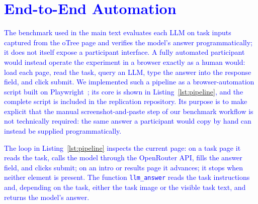 \documentclass[12pt,a4paper]{article}
\newcommand{\blue}[1]{\textcolor{blue}{#1}}
\begin{document}

\section{\blue{End-to-End Automation}}\label{app:pipeline}

\blue{The benchmark used in the main text evaluates each LLM on task inputs captured from the oTree page and verifies the model's answer programmatically; it does not itself expose a participant interface. A fully automated participant would instead operate the experiment in a browser exactly as a human would: load each page, read the task, query an LLM, type the answer into the response field, and click submit. We implemented such a pipeline as a browser-automation script built on Playwright~\citep{playwright_python}; its core is shown in Listing~\ref{lst:pipeline}, and the complete script is included in the replication repository.
Its purpose is to make explicit that the manual screenshot-and-paste step of our benchmark workflow is not technically required: the same answer a participant would copy by hand can instead be supplied programmatically.}

\blue{The loop in Listing~\ref{lst:pipeline} inspects the current page: on a task page it reads the task, calls the model through the OpenRouter API, fills the answer field, and clicks submit; on an intro or results page it advances; it stops when neither element is present. The function \texttt{llm\_answer} reads the task instructions and, depending on the task, either the task image or the visible task text, and returns the model's answer.}
\end{document}
